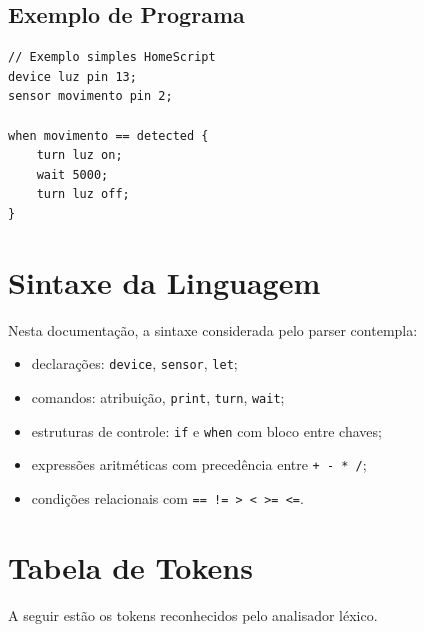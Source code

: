\documentclass[12pt,a4paper]{article}
\begin{document}
\subsection{Exemplo de Programa}
\begin{lstlisting}[style=homescript]
// Exemplo simples HomeScript
device luz pin 13;
sensor movimento pin 2;

when movimento == detected {
    turn luz on;
    wait 5000;
    turn luz off;
}
\end{lstlisting}

\section{Sintaxe da Linguagem}
Nesta documentação, a sintaxe considerada pelo parser contempla:
\begin{itemize}
  \item declarações: \texttt{device}, \texttt{sensor}, \texttt{let};
  \item comandos: atribuição, \texttt{print}, \texttt{turn}, \texttt{wait};
  \item estruturas de controle: \texttt{if} e \texttt{when} com bloco entre chaves;
  \item expressões aritméticas com precedência entre \texttt{+ - * /};
  \item condições relacionais com \texttt{== != > < >= <=}.
\end{itemize}

\section{Tabela de Tokens}
A seguir estão os tokens reconhecidos pelo analisador léxico.
\end{document}
